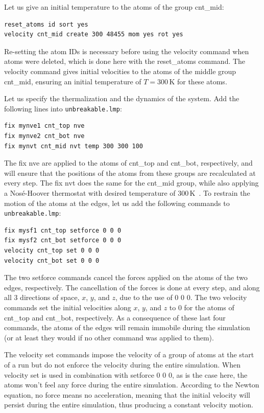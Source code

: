 \documentclass[9pt,tutorial]{livecoms}
\newcommand{\lmpcmd}[1]{\hspace{0pt}\colorbox{listing}{\textcolor{command}{\small{#1}}}\hspace{0pt}} %
\newcommand{\lmpcmdnote}[1]{\hspace{0pt}\colorbox{note_listing}{\textcolor{command}{\small{#1}}}\hspace{0pt}} %
\newcommand{\flecmd}[1]{\textcolor{command}{\texttt{#1}}} %
\begin{document}
Let us give an initial temperature to the atoms of the group \lmpcmd{cnt\_mid}:
\begin{lstlisting}
reset_atoms id sort yes
velocity cnt_mid create 300 48455 mom yes rot yes
\end{lstlisting}
Re-setting the atom IDs is necessary before using the \lmpcmd{velocity} command
when atoms were deleted, which is done here with the \lmpcmd{reset\_atoms} command.
The \lmpcmd{velocity} command gives initial velocities to the atoms of the middle
group \lmpcmd{cnt\_mid}, ensuring an initial temperature of $T = 300\,\text{K}$
for these atoms.

Let us specify the thermalization and the dynamics of the system.  Add the following
lines into \flecmd{unbreakable.lmp}:
\begin{lstlisting}
fix mynve1 cnt_top nve
fix mynve2 cnt_bot nve
fix mynvt cnt_mid nvt temp 300 300 100
\end{lstlisting}
The \lmpcmd{fix nve} are applied to the atoms of \lmpcmd{cnt\_top} and
\lmpcmd{cnt\_bot}, respectively, and will ensure that the positions of the atoms
from these groups are recalculated at every step.  The \lmpcmd{fix nvt} does the
same for the \lmpcmd{cnt\_mid} group, while also applying a Nos\'e-Hoover thermostat
with desired temperature of 300\,K~\cite{nose1984unified, hoover1985canonical}.
To restrain the motion of the atoms at the edges, let us add the following
commands to \flecmd{unbreakable.lmp}:
\begin{lstlisting}
fix mysf1 cnt_top setforce 0 0 0
fix mysf2 cnt_bot setforce 0 0 0
velocity cnt_top set 0 0 0
velocity cnt_bot set 0 0 0
\end{lstlisting}
The two \lmpcmd{setforce} commands cancel the forces applied on the atoms of the
two edges, respectively.  The cancellation of the forces is done at every step,
and along all 3 directions of space, $x$, $y$, and $z$, due to the use of
\lmpcmd{0 0 0}.  The two \lmpcmd{velocity} commands set the initial velocities
along $x$, $y$, and $z$ to 0 for the atoms of \lmpcmd{cnt\_top} and
\lmpcmd{cnt\_bot}, respectively.  As a consequence of these last four commands,
the atoms of the edges will remain immobile during the simulation (or at least
they would if no other command was applied to them).

\begin{note}
  The \lmpcmdnote{velocity set}
  commands impose the velocity of a group of atoms at the start of a run but do
  not enforce the velocity during the entire simulation.  When \lmpcmdnote{velocity set}
  is used in combination with \lmpcmdnote{setforce 0 0 0}, as is the case here, the
  atoms won't feel any force during the entire simulation.  According to the Newton
  equation, no force means no acceleration, meaning that the initial velocity
  will persist during the entire simulation, thus producing a constant velocity motion.
\end{note}
\end{document}
